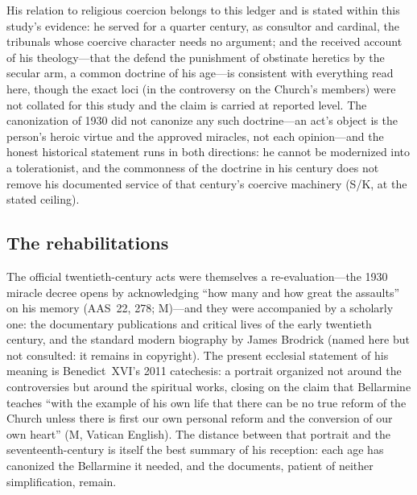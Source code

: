 His relation to religious coercion belongs to this ledger and is
stated within this study's evidence: he served for a quarter
century, as consultor and cardinal, the tribunals whose coercive
character needs no argument; and the received account of his
theology---that the  defend the punishment of
obstinate heretics by the secular arm, a common doctrine of his
age---is consistent with everything read here, though the exact
loci (in the controversy on the Church's members) were not
collated for this study and the claim is carried at reported
level. The canonization of 1930 did not canonize any such
doctrine---an act's object is the person's heroic virtue and the
approved miracles, not each opinion---and the honest historical
statement runs in both directions: he cannot be modernized into a
tolerationist, and the commonness of the doctrine in his century
does not remove his documented service of that century's coercive
machinery (S/K, at the stated ceiling).

\subsection{The rehabilitations}

The official twentieth-century acts were themselves a
re-evaluation---the 1930 miracle decree opens by acknowledging
``how many and how great the assaults'' on his memory (AAS~22,
278; M)---and they were accompanied by a scholarly one: the
documentary publications and critical lives of the early
twentieth century, and the standard modern biography by James
Brodrick (named here but not consulted: it remains in
copyright). The
present ecclesial statement of his meaning is Benedict~XVI's 2011
catechesis: a portrait organized not around the controversies but
around the spiritual works, closing on the claim that Bellarmine
teaches ``with the example of his own life that there can be no
true reform of the Church unless there is first our own personal
reform and the conversion of our own heart'' (M, Vatican English).
The distance between that portrait and the seventeenth-century
 is itself the best summary of his
reception: each age has canonized the Bellarmine it needed, and
the documents, patient of neither simplification, remain.
